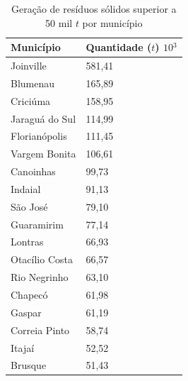\begin{table}[htb]
    \ABNTEXfontereduzida
    \centering
    \caption{Geração de resíduos sólidos superior a 50 mil \ensuremath{t} por município  \label{tab:sc-geracao} }
    \begin{tabular}{@{}ll@{}}
    \toprule
    \textbf{Município} & \textbf{Quantidade (\ensuremath{t}) $10{^3}$} \\ \midrule
    Joinville          & 581,41                                        \\
    Blumenau           & 165,89                                        \\
    Criciúma           & 158,95                                        \\
    Jaraguá do Sul     & 114,99                                        \\
    Florianópolis      & 111,45                                        \\
    Vargem Bonita      & 106,61                                        \\
    Canoinhas          & 99,73                                         \\
    Indaial            & 91,13                                         \\
    São José           & 79,10                                         \\
    Guaramirim         & 77,14                                         \\
    Lontras            & 66,93                                         \\
    Otacílio Costa     & 66,57                                         \\
    Rio Negrinho       & 63,10                                         \\
    Chapecó            & 61,98                                         \\
    Gaspar             & 61,19                                         \\
    Correia Pinto      & 58,74                                         \\
    Itajaí             & 52,52                                         \\
    Brusque            & 51,43                                         \\ \bottomrule
    \end{tabular}
    \end{table}

